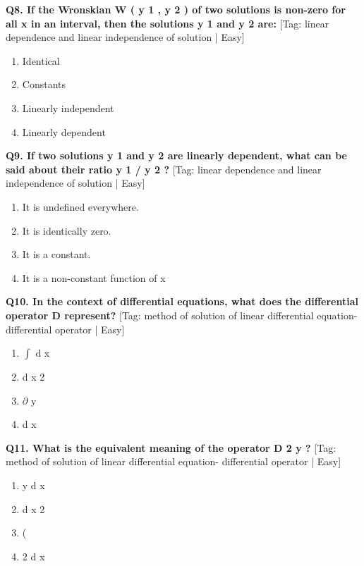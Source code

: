 \noindent\textbf{Q8. If the Wronskian W ( y 1 , y 2 ) of two solutions is non-zero for all x in an interval, then the solutions y 1 and y 2 are:} \hfill [Tag: linear dependence and linear independence of solution | Easy]
\begin{enumerate}[label=(\alph*),topsep=2pt,itemsep=1pt,partopsep=0pt,parsep=0pt]
    \item {{Identical}}
    \item {{Constants}}
    \item {{Linearly independent}}
    \item {{Linearly dependent}}
\end{enumerate}
\vspace{2mm}

\noindent\textbf{Q9. If two solutions y 1 and y 2 are linearly dependent, what can be said about their ratio y 1 / y 2 ?} \hfill [Tag: linear dependence and linear independence of solution | Easy]
\begin{enumerate}[label=(\alph*),topsep=2pt,itemsep=1pt,partopsep=0pt,parsep=0pt]
    \item {{It is undefined everywhere.}}
    \item {{It is identically zero.}}
    \item {{It is a constant.}}
    \item {{It is a non-constant function of x}}
\end{enumerate}
\vspace{2mm}

\noindent\textbf{Q10. In the context of differential equations, what does the differential operator D represent?} \hfill [Tag: method of solution of linear differential equation- differential operator | Easy]
\begin{enumerate}[label=(\alph*),topsep=2pt,itemsep=1pt,partopsep=0pt,parsep=0pt]
    \item {{$\int$ d x}}
    \item {{d x 2}}
    \item {{$\partial$ y}}
    \item {{d x}}
\end{enumerate}
\vspace{2mm}

\noindent\textbf{Q11. What is the equivalent meaning of the operator D 2 y ?} \hfill [Tag: method of solution of linear differential equation- differential operator | Easy]
\begin{enumerate}[label=(\alph*),topsep=2pt,itemsep=1pt,partopsep=0pt,parsep=0pt]
    \item {{y d x}}
    \item {{d x 2}}
    \item {{(}}
    \item {{2 d x}}
\end{enumerate}
\vspace{2mm}

